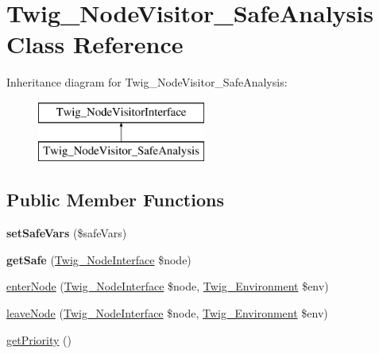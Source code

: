 \hypertarget{class_twig___node_visitor___safe_analysis}{}\section{Twig\+\_\+\+Node\+Visitor\+\_\+\+Safe\+Analysis Class Reference}
\label{class_twig___node_visitor___safe_analysis}
Inheritance diagram for Twig\+\_\+\+Node\+Visitor\+\_\+\+Safe\+Analysis\+:\begin{figure}[H]
\begin{center}
\leavevmode
\includegraphics[height=2.000000cm]{class_twig___node_visitor___safe_analysis}
\end{center}
\end{figure}
\subsection*{Public Member Functions}
\begin{DoxyCompactItemize}
\item 
\hypertarget{class_twig___node_visitor___safe_analysis_ae2afa581f7816a7d16dcc74f004767fc}{}{\bfseries set\+Safe\+Vars} (\$safe\+Vars)\label{class_twig___node_visitor___safe_analysis_ae2afa581f7816a7d16dcc74f004767fc}

\item 
\hypertarget{class_twig___node_visitor___safe_analysis_acc3b73509017790429de059f337b7a8c}{}{\bfseries get\+Safe} (\hyperlink{interface_twig___node_interface}{Twig\+\_\+\+Node\+Interface} \$node)\label{class_twig___node_visitor___safe_analysis_acc3b73509017790429de059f337b7a8c}

\item 
\hyperlink{class_twig___node_visitor___safe_analysis_ad3bfee38f2bc56df9500da7f20b6e13a}{enter\+Node} (\hyperlink{interface_twig___node_interface}{Twig\+\_\+\+Node\+Interface} \$node, \hyperlink{class_twig___environment}{Twig\+\_\+\+Environment} \$env)
\item 
\hyperlink{class_twig___node_visitor___safe_analysis_a436bb1ae16511148e860e5cfa2cad88f}{leave\+Node} (\hyperlink{interface_twig___node_interface}{Twig\+\_\+\+Node\+Interface} \$node, \hyperlink{class_twig___environment}{Twig\+\_\+\+Environment} \$env)
\item 
\hyperlink{class_twig___node_visitor___safe_analysis_a1e7a3c168dcd0901a0d2669c67575b55}{get\+Priority} ()
\end{DoxyCompactItemize}
